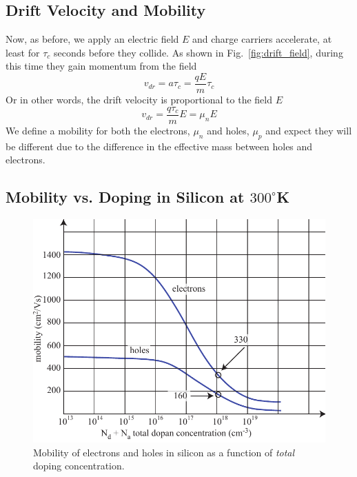 \subsection{Drift Velocity and Mobility}
Now, as before, we apply an electric field $E$ and charge carriers accelerate, at least for  $\tau_c$ seconds before they collide.
As shown in Fig.~\ref{fig:drift_field}, during this time they gain momentum from the field
\begin{equation}
        v_{dr} = a \tau_c = \frac{q E}{m} \tau_c
\end{equation}
Or in other words, the drift velocity is proportional to the field $E$
\begin{equation}
        v_{dr} = \frac{q \tau_c}{m} E = \mu_n E
\end{equation}
We define a mobility for both the electrons, $\mu_n$ and holes, $\mu_p$ and expect they will be different due to the difference in the effective mass between holes and electrons.
\subsection{Mobility vs. Doping in Silicon at $300^\circ$K}
\begin{center}
\begin{figure}[tb]
\begin{center}
\includegraphics[width=.75\columnwidth]{mobility}
\end{center}
\caption{Mobility of electrons and holes in silicon as a function of \emph{total} doping concentration. }
\label{fig:mobility}
\end{figure}
\end{center}

